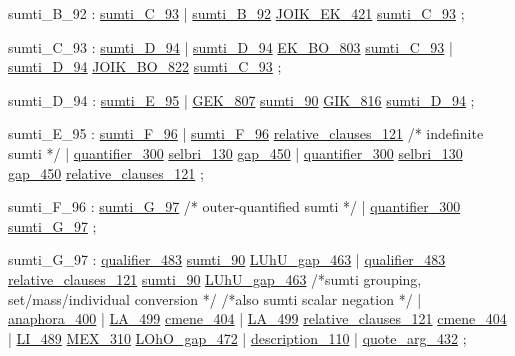 \label{html:y92}
sumti_B_92              :  \hyperref[html:y93]{sumti_C_93}
                        |  \hyperref[html:y92]{sumti_B_92}  \hyperref[html:y421]{JOIK_EK_421}  \hyperref[html:y93]{sumti_C_93}  
                        ;

\label{html:y93}
sumti_C_93              :  \hyperref[html:y94]{sumti_D_94}
                        |  \hyperref[html:y94]{sumti_D_94}  \hyperref[html:y803]{EK_BO_803}  \hyperref[html:y93]{sumti_C_93}
                        |  \hyperref[html:y94]{sumti_D_94}  \hyperref[html:y822]{JOIK_BO_822}  \hyperref[html:y93]{sumti_C_93}
                        ;

\label{html:y94}
sumti_D_94              :  \hyperref[html:y95]{sumti_E_95}
                        |  \hyperref[html:y807]{GEK_807}  \hyperref[html:y90]{sumti_90}  \hyperref[html:y816]{GIK_816}  \hyperref[html:y94]{sumti_D_94}
                        ;

\label{html:y95}
sumti_E_95              :  \hyperref[html:y96]{sumti_F_96}
                        |  \hyperref[html:y96]{sumti_F_96}  \hyperref[html:y121]{relative_clauses_121}
                           /* indefinite sumti */
                        |  \hyperref[html:y300]{quantifier_300}  \hyperref[html:y130]{selbri_130}  \hyperref[html:y450]{gap_450}
                        |  \hyperref[html:y300]{quantifier_300}  \hyperref[html:y130]{selbri_130}
                                \hyperref[html:y450]{gap_450}  \hyperref[html:y121]{relative_clauses_121}
                        ;

\label{html:y96}
sumti_F_96              :  \hyperref[html:y97]{sumti_G_97}
                           /* outer-quantified sumti */
                        |  \hyperref[html:y300]{quantifier_300}  \hyperref[html:y97]{sumti_G_97}
                        ;

\label{html:y97}
sumti_G_97              :  \hyperref[html:y483]{qualifier_483}  \hyperref[html:y90]{sumti_90}  \hyperref[html:y463]{LUhU_gap_463}
                        |  \hyperref[html:y483]{qualifier_483}  \hyperref[html:y121]{relative_clauses_121}
                                \hyperref[html:y90]{sumti_90}  \hyperref[html:y463]{LUhU_gap_463}
                           /*sumti grouping, set/mass/individual conversion */
                           /*also sumti scalar negation */
                        |  \hyperref[html:y400]{anaphora_400}
                        |  \hyperref[html:y499]{LA_499}  \hyperref[html:y404]{cmene_404}
                        |  \hyperref[html:y499]{LA_499}  \hyperref[html:y121]{relative_clauses_121}  \hyperref[html:y404]{cmene_404}
                        |  \hyperref[html:y489]{LI_489}  \hyperref[html:y310]{MEX_310}  \hyperref[html:y472]{LOhO_gap_472}
                        |  \hyperref[html:y110]{description_110}
                        |  \hyperref[html:y432]{quote_arg_432}
                        ;

